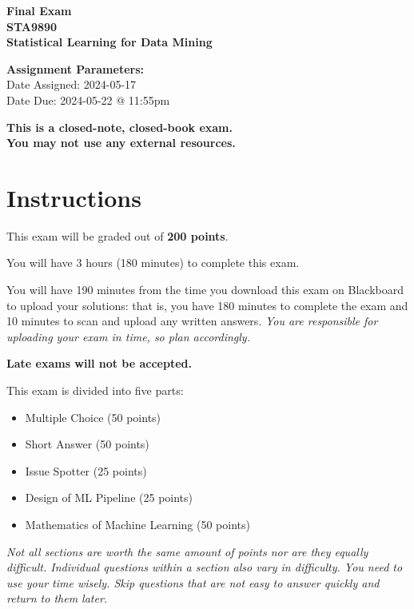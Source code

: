 \documentclass[12pt]{article}
\begin{document}
\begin{center}
    {\Large \bf Final Exam \\ STA9890 \\ Statistical Learning for Data Mining}
\end{center}

{\bf Assignment Parameters:} \\
\phantom{abc}Date Assigned: 2024-05-17\\
\phantom{abc}Date Due: 2024-05-22 @ 11:55pm \\

\begin{center}
    \bf \large This is a closed-note, closed-book exam.\\You may not use any external resources.
\end{center}

\section*{Instructions}
This exam will be graded out of \textbf{200 points}. 

You will have 3 hours (180 minutes) to complete this exam. 

You will have 190 minutes from the time you download this exam on Blackboard to upload your solutions: 
that is, you have 180 minutes to complete the exam and 10 minutes to scan and upload any written answers. 
\emph{You are responsible for uploading your exam in time, so plan accordingly.}

\begin{center} \large \textbf{Late exams will not be accepted.} \end{center}



This exam is divided into five parts: 
\begin{itemize}
    \item Multiple Choice (50 points)
    \item Short Answer (50 points)
    \item Issue Spotter (25 points)
    \item Design of ML Pipeline (25 points)
    \item Mathematics of Machine Learning (50 points)
\end{itemize}

\emph{Not all sections are worth the same amount of points nor are they equally difficult. Individual questions within a section also vary in difficulty. You need to use your time wisely. Skip questions that are not easy to answer quickly and return to them later.}
\end{document}

